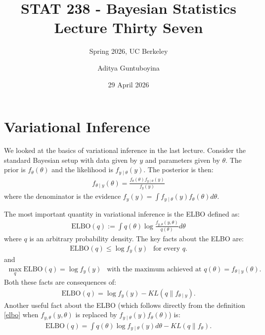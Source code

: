 \documentclass{scrartcl}
\begin{document}
\title{STAT 238 - Bayesian Statistics  \\
  Lecture Thirty Seven} 
\subtitle{Spring 2026, UC Berkeley}

\author{Aditya Guntuboyina}


\date{29 April 2026}

\maketitle

\section{Variational Inference}
We looked at the basics of variational inference in the last lecture. 
Consider
the standard Bayesian setup with data given by $y$ and parameters
given by $\theta$. The prior is $f_{\theta}(\theta)$ and the
likelihood is $f_{y \mid \theta}(y)$. The posterior is then:
\begin{align*}
  f_{\theta \mid y}(\theta) = \frac{f_{\theta}(\theta) f_{y \mid
  \theta}(y)}{f_y(y)}
\end{align*}
where the denominator is the evidence $f_{y}(y) = \int f_{y \mid
  \theta}(y) f_{\theta}(\theta) d\theta$.

The most important quantity in variational inference is the ELBO
defined as:
\begin{align}\label{elbo}
  \text{ELBO}(q) := \int q(\theta) \log \frac{f_{y, \theta}(y,
  \theta)}{q(\theta)} d\theta
\end{align}
where $q$ is an arbitrary probability density. The key facts about the
ELBO are:
\begin{align}\label{elbo_1}
\text{ELBO}(q) \leq \log f_{y}(y) ~~ \text{ for every } q.  
\end{align}
and
\begin{align}\label{elbo_2}
\max_{q} \text{ELBO}(q) = \log f_y(y) ~~ \text{  with the maximum
achieved at } q(\theta) = f_{\theta \mid y}(\theta).  
\end{align}
Both these facts are consequences of:
\begin{align*}
  \text{ELBO}(q) = \log f_{y}(y) - KL\left(q \| f_{\theta \mid y}
  \right). 
\end{align*}
Another useful fact about the ELBO (which follows directly from the
definition \eqref{elbo} when $f_{y, \theta}(y, \theta)$ is replaced by
$f_{y \mid \theta}(y) f_{\theta}(\theta)$) is:
\begin{align*}
  \text{ELBO}(q) = \int q(\theta) \log f_{y \mid \theta}(y) d\theta -
  KL(q \| f_{\theta}). 
\end{align*}
\end{document}
